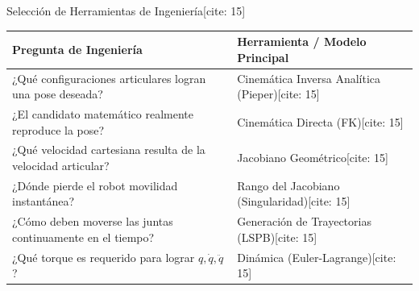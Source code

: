 \documentclass[aspectratio=169, xcolor={table,xcdraw}]{beamer}
\begin{document}
\begin{frame}{Selección de Herramientas de Ingeniería[cite: 15]}
    \begin{center}
        \renewcommand{\arraystretch}{1.5}
        \footnotesize
        \begin{tabular}{|>{\raggedright\arraybackslash}p{7cm}|>{\raggedright\arraybackslash}p{6cm}|}
        \hline
        \rowcolor{ucbblue!20} \textbf{Pregunta de Ingeniería} & \textbf{Herramienta / Modelo Principal} \\ \hline
        ¿Qué configuraciones articulares logran una pose deseada? & Cinemática Inversa Analítica (Pieper)[cite: 15] \\ \hline
        ¿El candidato matemático realmente reproduce la pose? & Cinemática Directa (FK)[cite: 15] \\ \hline
        ¿Qué velocidad cartesiana resulta de la velocidad articular? & Jacobiano Geométrico[cite: 15] \\ \hline
        ¿Dónde pierde el robot movilidad instantánea? & Rango del Jacobiano (Singularidad)[cite: 15] \\ \hline
        ¿Cómo deben moverse las juntas continuamente en el tiempo? & Generación de Trayectorias (LSPB)[cite: 15] \\ \hline
        ¿Qué torque es requerido para lograr $q, \dot{q}, \ddot{q}$? & Dinámica (Euler-Lagrange)[cite: 15] \\ \hline
        \end{tabular}
    \end{center}
\end{frame}
\end{document}
